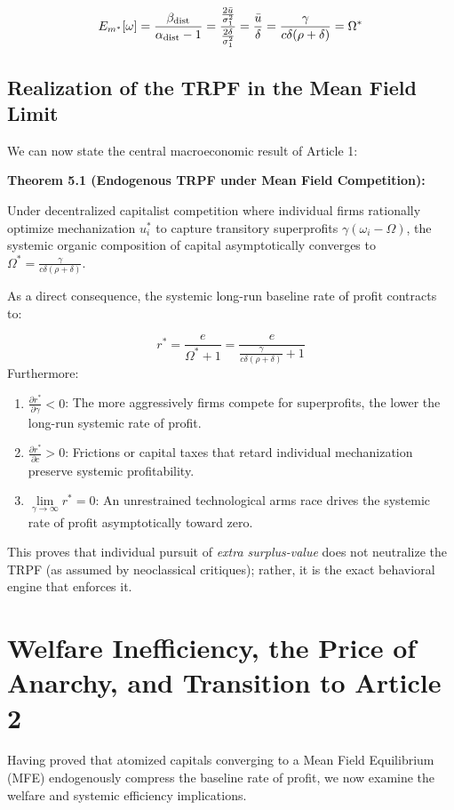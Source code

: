 \documentclass[11pt,letterpaper]{report}
\newcommand{\fitmath}[1]{\begingroup\setbox0=\hbox{$\displaystyle #1$}\ifdim\wd0>\linewidth\resizebox{\linewidth}{!}{$\displaystyle #1$}\else\displaystyle #1\fi\endgroup}
\begin{document}
\[\fitmath{{E}_{{m}^{*}}[\omega ]=\frac{{\beta }_{\mathrm{dist}}}{{\alpha }_{\mathrm{dist}}-1}=\frac{\frac{2\bar{u}}{{\sigma }_{1}^{2}}}{\frac{2\delta }{{\sigma }_{1}^{2}}}=\frac{\bar{u}}{\delta }=\frac{\gamma }{c\delta (\rho +\delta )}={\Omega }^{*}}\]
\subsection{Realization of the TRPF in the Mean Field Limit}
We can now state the central macroeconomic result of Article 1:

\textbf{Theorem 5.1 (Endogenous TRPF under Mean Field Competition):}

Under decentralized capitalist competition where individual firms rationally optimize mechanization ${u}_{i}^{*}$ to capture transitory superprofits $\gamma ({\omega }_{i}-\Omega )$, the systemic organic composition of capital asymptotically converges to ${\Omega }^{*}=\frac{\gamma }{c\delta (\rho +\delta )}$.

As a direct consequence, the systemic long-run baseline rate of profit contracts to:

\[
{r}^{*}=\frac{e}{{\Omega }^{*}+1}=\frac{e}{\frac{\gamma }{c\delta (\rho +\delta )}+1}
\]
Furthermore:

\begin{enumerate}
\item $\frac{\partial {r}^{*}}{\partial \gamma }<0$: The more aggressively firms compete for superprofits, the lower the long-run systemic rate of profit.
\item $\frac{\partial {r}^{*}}{\partial c}>0$: Frictions or capital taxes that retard individual mechanization preserve systemic profitability.
\item $\lim\limits_{{\gamma } \rightarrow {\infty }}{r}^{*}=0$: An unrestrained technological arms race drives the systemic rate of profit asymptotically toward zero.
\end{enumerate}
This proves that individual pursuit of \emph{extra surplus-value} does not neutralize the TRPF (as assumed by neoclassical critiques); rather, it is the exact behavioral engine that enforces it.

\section{Welfare Inefficiency, the Price of Anarchy, and Transition to Article 2}
Having proved that atomized capitals converging to a Mean Field Equilibrium (MFE) endogenously compress the baseline rate of profit, we now examine the welfare and systemic efficiency implications.
\end{document}
